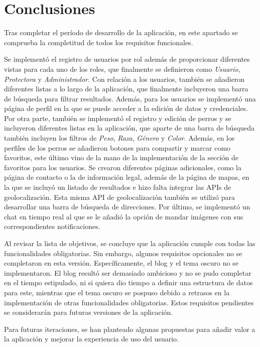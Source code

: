 \documentclass[a4paper, 12pt]{article}
\begin{document}
\newpage
\section{Conclusiones}
Tras completar el período de desarrollo de la aplicación, en este apartado se comprueba la completitud de todos los requisitos funcionales. 

Se implementó el registro de usuarios por rol además de proporcionar diferentes vistas para cada uno de los roles, que finalmente se definieron como \textit{Usuario},  \textit{Protectora}  y   \textit{Administrador}.  Con relación a los usuarios, también se añadieron diferentes listas a lo largo de la aplicación, que finalmente incluyeron una barra de búsqueda para filtrar resultados. Además, para los usuarios se implementó una página de perfil en la que se puede acceder a la edición de datos y credenciales. Por otra parte, también se implementó el registro y edición de perros y se incluyeron diferentes listas en la aplicación, que aparte de una barra de búsqueda también incluyen los filtros de  \textit{Peso},  \textit{Raza},  \textit{Género} y  \textit{Color}. Además, en los perfiles de los perros se añadieron botones para compartir y marcar como favoritos, este último vino de la mano de la implementación de la sección de favoritos para los usuarios. Se crearon diferentes páginas adicionales, como la página de contacto o la de información legal, además de la página de mapas, en la que se incluyó un listado de resultados e hizo falta integrar las APIs de geolocalización. Esta misma API de geolocalización también se utilizó para desarrollar una barra de búsqueda de direcciones. Por último, se implementó un chat en tiempo real al que se le añadió la opción de mandar imágenes con sus correspondientes notificaciones.

Al revisar la lista de objetivos, se concluye que la aplicación cumple con todas las funcionalidades obligatorias. Sin embargo, algunos requisitos opcionales no se completaron en esta versión. Específicamente, el blog y el tema oscuro no se implementaron. El blog resultó ser demasiado ambicioso y no se pudo completar en el tiempo estipulado, ni si quiera dio tiempo a definir una estructura de datos para este, mientras que el tema oscuro se pospuso debido a retrasos en la implementación de otras funcionalidades obligatorias. Estos requisitos pendientes se considerarán para futuras versiones de la aplicación.

Para futuras iteraciones, se han planteado algunas propuestas para añadir valor a la aplicación y mejorar la experiencia de uso del usuario.
\end{document}

